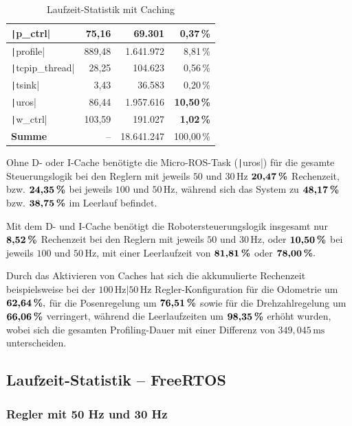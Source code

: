 \begin{table}[H]
{{\begin{minipage}[b]{0.50\hsize}
\begin{tabular}{|l|r|r|r|}
        \texttt|p_ctrl| & 75,16 & 69.301 & \textbf{0,37\,\%} \\ \hline
        \texttt|profile| & 889,48 & 1.641.972 & 8,81\,\% \\ \hline
        \texttt|tcpip_thread| & 28,25 & 104.623 & 0,56\,\% \\ \hline
        \texttt|tsink| & 3,43 & 36.583 & 0,20\,\% \\ \hline
        \texttt|uros| & 86,44 & 1.957.616 & \textbf{10,50\,\%} \\ \hline
        \texttt|w_ctrl| & 103,59 & 191.027 & \textbf{1,02\,\%} \\ \hline
        \hline
        \textbf{Summe} & -- & 18.641.247 & 100,00\,\% \\ \hline
        \end{tabular}
        \caption{Laufzeit-Statistik mit Caching}
    \end{minipage}
}}
\end{table}

Ohne D- oder I-Cache benötigte die Micro-ROS-Task (\texttt|uros|) für
die gesamte Steuerungslogik bei den Reglern mit jeweils $50$ und $30\,\text{Hz}$
$\textbf{20,47\,\%}$ Rechenzeit, bzw. $\textbf{24,35\,\%}$ bei jeweils $100$ und
$50\,\text{Hz}$, während sich das System zu $\textbf{48,17\,\%}$ bzw.
$\textbf{38,75\,\%}$ im Leerlauf befindet.

Mit dem D- und I-Cache benötigt die Robotersteuerungslogik insgesamt nur
$\textbf{8,52\,\%}$ Rechenzeit bei den Reglern mit jeweils $50$ und
$30\,\text{Hz}$, oder $\textbf{10,50\,\%}$ bei jeweils $100$ und
$50\,\text{Hz}$, mit einer Leerlaufzeit von $\textbf{81,81\,\%}$ oder
$\textbf{78,00\,\%}.$

Durch das Aktivieren von Caches hat sich die akkumulierte Rechenzeit
beispielsweise bei der $100\,\text{Hz}|50\,\text{Hz}$ Regler-Konfiguration für
die Odometrie um $\textbf{62,64\,\%},$ für die Posenregelung um
$\textbf{76,51\,\%}$ sowie für die Drehzahlregelung um $\textbf{66,06\,\%}$
verringert, während die Leerlaufzeiten um $\textbf{98,35\,\%}$ erhöht wurden,
wobei sich die gesamten Profiling-Dauer mit einer Differenz von
$349,045\,\text{ms}$ unterscheiden.

\subsection{Laufzeit-Statistik -- FreeRTOS}

\subsubsection{Regler mit 50 Hz und 30 Hz}

